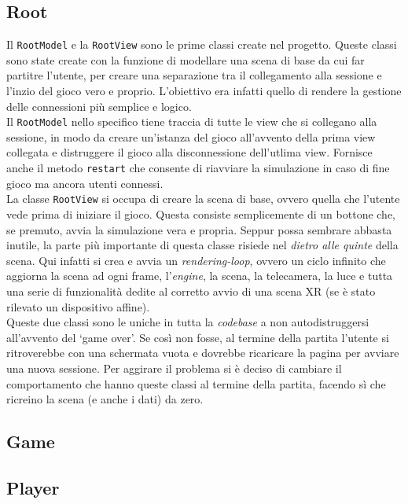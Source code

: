 \subsection{Root}\label{subsec:rootclass}
Il \texttt{RootModel} e la \texttt{RootView} sono le prime classi create nel progetto. Queste classi sono state create con la funzione di modellare una scena di base da cui far
partitre l'utente, per creare una separazione tra il collegamento alla sessione e l'inzio del gioco vero e proprio. L'obiettivo era infatti quello di rendere la gestione delle
connessioni più semplice e logico.\\
Il \texttt{RootModel} nello specifico tiene traccia di tutte le view che si collegano alla sessione, in modo da creare un'istanza del gioco all'avvento della prima view collegata e 
distruggere il gioco alla disconnessione dell'utlima view. Fornisce anche il metodo \texttt{restart} che consente di riavviare la simulazione in caso di fine gioco ma ancora utenti 
connessi.\\
La classe \texttt{RootView} si occupa di creare la scena di base, ovvero quella che l'utente vede prima di iniziare il gioco. Questa consiste semplicemente di un bottone che, se 
premuto, avvia la simulazione vera e propria. Seppur possa sembrare abbasta inutile, la parte più importante di questa classe risiede nel \textit{dietro alle quinte} della scena. 
Qui infatti si crea e avvia un \textit{rendering-loop}, ovvero un ciclo infinito che aggiorna la scena ad ogni frame, l'\textit{engine}, la scena, la telecamera, la luce e tutta
una serie di funzionalità dedite al corretto avvio di una scena XR (se è stato rilevato un dispositivo affine).\\
Queste due classi sono le uniche in tutta la \textit{codebase} a non autodistruggersi all'avvento del `game over'. Se così non fosse, al termine della partita l'utente si ritroverebbe
con una schermata vuota e dovrebbe ricaricare la pagina per avviare una nuova sessione. Per aggirare il problema si è deciso di cambiare il comportamento che hanno queste classi al 
termine della partita, facendo sì che ricreino la scena (e anche i dati) da zero.\\

\subsection{Game}\label{subsec:game}
\subsection{Player}\label{subsec:player}
